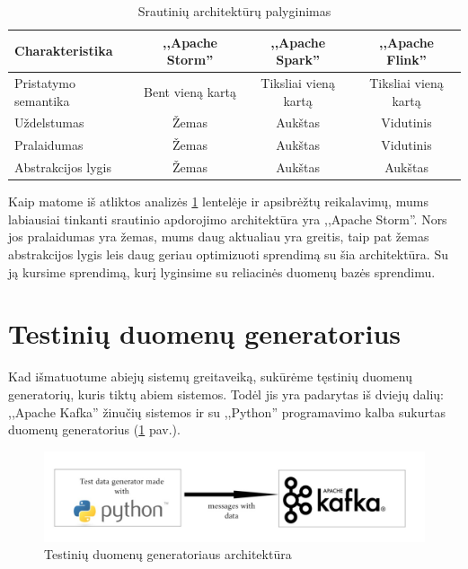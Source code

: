 \documentclass{VUMIFPSkursinis}
\begin{document}
\begin{center}
    \begin{table}[!htbp]
        \caption{Srautinių architektūrų palyginimas}
        \label{table:comparer}
        \begin{tabular}{ | l | c | c | c | } 
            \hline
            Charakteristika & ,,Apache Storm'' & ,,Apache Spark'' & ,,Apache Flink'' \\* \hline
            Pristatymo semantika & Bent vieną kartą & Tiksliai vieną kartą & Tiksliai vieną kartą \\* \hline
            Uždelstumas & Žemas & Aukštas & Vidutinis \\* \hline
            Pralaidumas & Žemas & Aukštas & Vidutinis \\* \hline
            Abstrakcijos lygis & Žemas & Aukštas & Aukštas \\* \hline
        \end{tabular}
    \end{table}
\end{center}\par

Kaip matome iš atliktos analizės \ref{table:comparer} lentelėje ir apsibrėžtų reikalavimų, mums labiausiai tinkanti srautinio apdorojimo architektūra yra ,,Apache Storm''. 
Nors jos pralaidumas yra žemas, mums daug aktualiau yra greitis, taip pat žemas abstrakcijos lygis leis daug geriau optimizuoti sprendimą su šia architektūra. Su ją kursime
sprendimą, kurį lyginsime su reliacinės duomenų bazės sprendimu.

\section{Testinių duomenų generatorius}

Kad išmatuotume abiejų sistemų greitaveiką, sukūrėme tęstinių duomenų generatorių, kuris tiktų abiem sistemos. Todėl jis yra padarytas iš dviejų dalių:
,,Apache Kafka'' žinučių sistemos ir su ,,Python'' programavimo kalba sukurtas duomenų generatorius (\ref{fig:generator} pav.).

\begin{figure}[!htbp]
    \centering
    \includegraphics[width=1\textwidth]{img/testdatagenerator2.jpg}
    \caption{Testinių duomenų generatoriaus architektūra}
    \label{fig:generator}
\end{figure}
\end{document}
